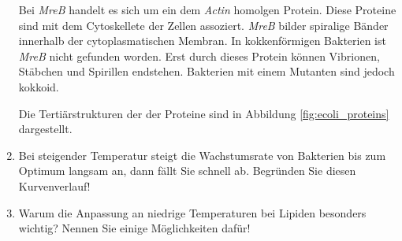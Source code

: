 \begin{enumerate}
		Bei \emph{MreB} handelt es sich um ein dem \emph{Actin} homolgen Protein.
		Diese Proteine sind mit dem Cytoskellete der Zellen assoziert.
		\emph{MreB} bilder spiralige Bänder innerhalb der cytoplasmatischen Membran.
		In kokkenförmigen Bakterien ist \emph{MreB} nicht gefunden worden.
		Erst durch dieses Protein können Vibrionen, Stäbchen und Spirillen endstehen.
		Bakterien mit einem Mutanten sind jedoch kokkoid.

		Die Tertiärstrukturen der der Proteine sind in Abbildung \ref{fig:ecoli_proteins} dargestellt.
		
	\item Bei steigender Temperatur steigt die Wachstumsrate von Bakterien bis zum Optimum langsam an, dann fällt Sie schnell ab. Begründen Sie diesen Kurvenverlauf!
	\item Warum die Anpassung an niedrige Temperaturen bei Lipiden besonders wichtig? Nennen Sie einige Möglichkeiten dafür!
\end{enumerate}
